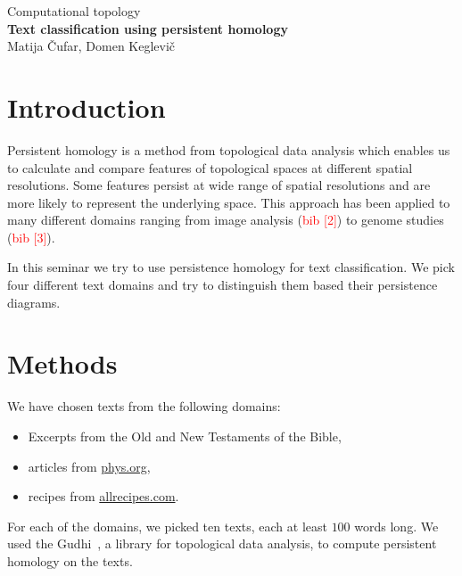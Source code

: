 \documentclass[12pt,a4paper]{amsart}
\begin{document}
\thispagestyle{empty}
\begin{center}{\large
Computational topology\\[4mm]
{\bf Text classification using persistent homology}\\[4mm]
Matija Čufar, Domen Keglevič\\[6mm]
}
\end{center}
\bigskip

\section{Introduction}
Persistent homology is a method from topological data analysis which enables us to calculate and 
compare features of topological spaces at different spatial resolutions. Some features persist 
at wide range of spatial resolutions and are more likely to represent the underlying space. This 
approach  has been applied to many different domains ranging from image analysis
 (\textcolor{red}{bib [2]}) to
  genome studies (\textcolor{red}{bib [3]}).

 In this seminar we try to use persistence homology for text classification. We pick four 
 different text domains and try to 
distinguish them based their persistence diagrams.

\section{Methods}

We have chosen texts from the following domains:

\begin{itemize}
  \setlength\itemsep{0.5em}
\item Excerpts from the Old and New Testaments of the Bible,
\item articles from \url{phys.org},
\item recipes from \url{allrecipes.com}.
\end{itemize}


For each of the domains, we picked ten texts, each at least $100$ words long. We
used the Gudhi~\cite{maria2014gudhi}, a library for topological data analysis,
to compute persistent homology on the texts.
\end{document}
